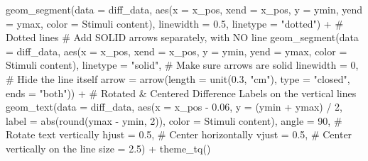 \documentclass[
  bookmarksnumbered]{article}
\newenvironment{Shaded}{\begin{snugshade}}{\end{snugshade}}
\newcommand{\AttributeTok}[1]{\textcolor[rgb]{0.80,0.80,0.80}{#1}}
\newcommand{\CommentTok}[1]{\textcolor[rgb]{0.50,0.62,0.50}{#1}}
\newcommand{\DecValTok}[1]{\textcolor[rgb]{0.86,0.86,0.80}{#1}}
\newcommand{\FloatTok}[1]{\textcolor[rgb]{0.75,0.75,0.82}{#1}}
\newcommand{\FunctionTok}[1]{\textcolor[rgb]{0.94,0.94,0.56}{#1}}
\newcommand{\NormalTok}[1]{\textcolor[rgb]{0.80,0.80,0.80}{#1}}
\newcommand{\SpecialCharTok}[1]{\textcolor[rgb]{0.86,0.64,0.64}{#1}}
\newcommand{\StringTok}[1]{\textcolor[rgb]{0.80,0.58,0.58}{#1}}
\begin{document}
\begin{Shaded}
\begin{Highlighting}[]
  \FunctionTok{geom\_segment}\NormalTok{(}\AttributeTok{data =}\NormalTok{ diff\_data, }
               \FunctionTok{aes}\NormalTok{(}\AttributeTok{x =}\NormalTok{ x\_pos, }\AttributeTok{xend =}\NormalTok{ x\_pos, }
                   \AttributeTok{y =}\NormalTok{ ymin, }\AttributeTok{yend =}\NormalTok{ ymax, }
                   \AttributeTok{color =} \StringTok{\textasciigrave{}}\AttributeTok{Stimuli content}\StringTok{\textasciigrave{}}\NormalTok{),}
               \AttributeTok{linewidth =} \FloatTok{0.5}\NormalTok{,}
               \AttributeTok{linetype =} \StringTok{"dotted"}\NormalTok{) }\SpecialCharTok{+}  \CommentTok{\# Dotted lines}
  \CommentTok{\# Add SOLID arrows separately, with NO line}
  \FunctionTok{geom\_segment}\NormalTok{(}\AttributeTok{data =}\NormalTok{ diff\_data, }
               \FunctionTok{aes}\NormalTok{(}\AttributeTok{x =}\NormalTok{ x\_pos, }\AttributeTok{xend =}\NormalTok{ x\_pos, }
                   \AttributeTok{y =}\NormalTok{ ymin, }\AttributeTok{yend =}\NormalTok{ ymax, }
                   \AttributeTok{color =} \StringTok{\textasciigrave{}}\AttributeTok{Stimuli content}\StringTok{\textasciigrave{}}\NormalTok{),}
               \AttributeTok{linetype =} \StringTok{"solid"}\NormalTok{,    }\CommentTok{\# Make sure arrows are solid}
               \AttributeTok{linewidth =} \DecValTok{0}\NormalTok{,         }\CommentTok{\# Hide the line itself}
               \AttributeTok{arrow =} \FunctionTok{arrow}\NormalTok{(}\AttributeTok{length =} \FunctionTok{unit}\NormalTok{(}\FloatTok{0.3}\NormalTok{, }\StringTok{"cm"}\NormalTok{), }\AttributeTok{type =} \StringTok{"closed"}\NormalTok{, }\AttributeTok{ends =} \StringTok{"both"}\NormalTok{)) }\SpecialCharTok{+}
  \CommentTok{\# Rotated \& Centered Difference Labels on the vertical lines}
  \FunctionTok{geom\_text}\NormalTok{(}\AttributeTok{data =}\NormalTok{ diff\_data, }
            \FunctionTok{aes}\NormalTok{(}\AttributeTok{x =}\NormalTok{ x\_pos }\SpecialCharTok{{-}} \FloatTok{0.06}\NormalTok{, }\AttributeTok{y =}\NormalTok{ (ymin }\SpecialCharTok{+}\NormalTok{ ymax) }\SpecialCharTok{/} \DecValTok{2}\NormalTok{, }
                \AttributeTok{label =} \FunctionTok{abs}\NormalTok{(}\FunctionTok{round}\NormalTok{(ymax }\SpecialCharTok{{-}}\NormalTok{ ymin, }\DecValTok{2}\NormalTok{)), }
                \AttributeTok{color =} \StringTok{\textasciigrave{}}\AttributeTok{Stimuli content}\StringTok{\textasciigrave{}}\NormalTok{), }
            \AttributeTok{angle =} \DecValTok{90}\NormalTok{,        }\CommentTok{\# Rotate text vertically}
            \AttributeTok{hjust =} \FloatTok{0.5}\NormalTok{,       }\CommentTok{\# Center horizontally}
            \AttributeTok{vjust =} \FloatTok{0.5}\NormalTok{,       }\CommentTok{\# Center vertically on the line}
            \AttributeTok{size =} \FloatTok{2.5}\NormalTok{) }\SpecialCharTok{+}
  \FunctionTok{theme\_tq}\NormalTok{()}
\end{Highlighting}
\end{Shaded}
\end{document}
